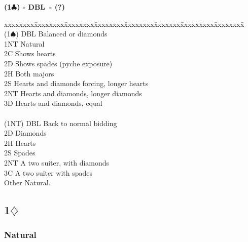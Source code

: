 \documentclass[10pt]{article}
\renewcommand{\c}{$\clubsuit$}
\renewcommand{\d}{$\diamondsuit$}
\newcommand{\s}{$\spadesuit$}
\newcommand{\x}{DBL}
\newenvironment{bidtable}[1][]
{\textbf{#1}
  \begin{adjustwidth}{1em}{}
    \addvspace{2pt}
    \begin{tabbing}
      xxxxxxxx\=xxxxxxxx\=xxxxxxxx\=xxxxxxxx\=xxxxxxxx\=xxxxxxx\=xxxxxxxxx\=xxxxxxxx\=\kill}
{\end{tabbing}\end{adjustwidth}\bigskip}%
\newcommand{\pdfd}{\texorpdfstring{\d{}}{D}}
\begin{document}
\begin{bidtable}[(1\c) - \x\ - (?)]
                                                              \\
(1\s)  \> DBL   \> Balanced or diamonds                       \\
       \> 1NT   \> Natural                                    \\
       \> 2C    \> Shows hearts                               \\
       \> 2D    \> Shows spades (pyche exposure)              \\
       \> 2H    \> Both majors                                \\
       \> 2S    \> Hearts and diamonds forcing, longer hearts \\
       \> 2NT   \> Hearts and diamonds, longer diamonds       \\
       \> 3D    \> Hearts and diamonds, equal                 \\
                                                              \\
(1NT)  \> DBL   \> Back to normal bidding                     \\
       \> 2D    \> Diamonds                                   \\
       \> 2H    \> Hearts                                     \\
       \> 2S    \> Spades                                     \\
       \> 2NT   \> A two suiter, with diamonds                \\
       \> 3C    \> A two suiter with spades                   \\
       \> Other \> Natural.
\end{bidtable}

\subsection{1\pdfd}

\subsubsection{Natural}
\end{document}
